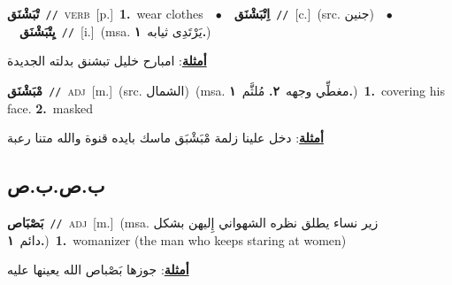 \documentclass[10pt,a4paper,twoside]{article} %
\begin{document}
\begin{multicols}{2}
{\setlength\topsep{0pt}\textbf{\foreignlanguage{arabic}{تْبَشْنَق}}\ {\color{gray}\texttt{//}\color{black}}\ \textsc{verb}\ [p.]\ \textbf{1.}~wear clothes\ \ $\bullet$\ \ \setlength\topsep{0pt}\textbf{\foreignlanguage{arabic}{اِتْبَشْنَق}}\ {\color{gray}\texttt{//}\color{black}}\ [c.]\ (src. \color{gray}\foreignlanguage{arabic}{جنين}\color{black})\ \ $\bullet$\ \ \setlength\topsep{0pt}\textbf{\foreignlanguage{arabic}{يِتْبَشْنَق}}\ {\color{gray}\texttt{//}\color{black}}\ [i.]\ \color{gray}(msa. \foreignlanguage{arabic}{يَرْتَدِى ثيابه}~\foreignlanguage{arabic}{\textbf{١.}})\color{black}\  \begin{flushright}\color{gray}\foreignlanguage{arabic}{\textbf{\underline{\foreignlanguage{arabic}{أمثلة}}}: امبارح خليل تبشنق بدلته الجديدة}\end{flushright}\color{black}} \vspace{2mm}

{\setlength\topsep{0pt}\textbf{\foreignlanguage{arabic}{مْبَشْنَق}}\ {\color{gray}\texttt{//}\color{black}}\ \textsc{adj}\ [m.]\ (src. \color{gray}\foreignlanguage{arabic}{الشمال}\color{black})\ \color{gray}(msa. \foreignlanguage{arabic}{مغطِّي وجهه}~\foreignlanguage{arabic}{\textbf{٢.}}  \foreignlanguage{arabic}{مُلثَّم}~\foreignlanguage{arabic}{\textbf{١.}})\color{black}\ \textbf{1.}~covering his face.  \textbf{2.}~masked\  \begin{flushright}\color{gray}\foreignlanguage{arabic}{\textbf{\underline{\foreignlanguage{arabic}{أمثلة}}}: دخل علينا زلمة مْبَشْبَق ماسك بايده قنوة والله متنا رعبة}\end{flushright}\color{black}} \vspace{2mm}

\vspace{-3mm}
\subsection*{\color{blue}\foreignlanguage{arabic}{ب.ص.ب.ص}\color{blue}{}} 

{\setlength\topsep{0pt}\textbf{\foreignlanguage{arabic}{بَصْبَاص}}\ {\color{gray}\texttt{//}\color{black}}\ \textsc{adj}\ [m.]\ \color{gray}(msa. \foreignlanguage{arabic}{زير نساء يطلق نظره الشهواني إِليهن بشكل دائم}~\foreignlanguage{arabic}{\textbf{١.}})\color{black}\ \textbf{1.}~womanizer (the man who keeps staring at women)\  \begin{flushright}\color{gray}\foreignlanguage{arabic}{\textbf{\underline{\foreignlanguage{arabic}{أمثلة}}}: جوزها بَصْباص الله يعينها عليه}\end{flushright}\color{black}} \vspace{2mm}


\end{multicols}
\end{document}
